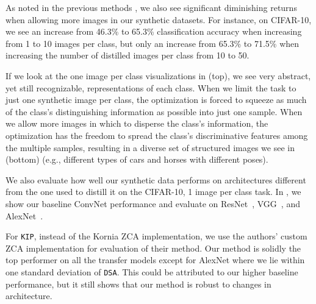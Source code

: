 \documentclass[main.tex]{subfiles}
\begin{document}
As noted in the previous methods \citep{dd}, we also see significant diminishing returns when allowing more images in our synthetic datasets. For instance, on CIFAR-10, we see an increase from 46.3\% to 65.3\% classification accuracy when increasing from 1 to 10 images per class, but only an increase from 65.3\% to 71.5\% when increasing the number of distilled images per class from 10 to 50.

If we look at the one image per class visualizations in  (top), we see very abstract, yet still recognizable, representations of each class. When we limit the task to just one synthetic image per class, the optimization is forced to squeeze as much of the class's distinguishing information as possible into just one sample. When we allow more images in which to disperse the class's information, the optimization has the freedom to spread the class's discriminative features among the multiple samples, resulting in a diverse set of structured images we see in  (bottom) (e.g., different types of cars and horses with different poses).



We also evaluate how well our synthetic data performs on architectures different from the one used to distill it on the CIFAR-10, 1 image per class task. In , we show our baseline \linebreak ConvNet performance and evaluate on ResNet~\cite{resnet}, VGG~\cite{vgg}, and AlexNet~\cite{alexnet}. 
 
For \texttt{KIP}, instead of the Kornia \cite{kornia} ZCA implementation, we use the authors' custom ZCA implementation for evaluation of their method. Our method is solidly the top performer on all the transfer models except for AlexNet where we lie within one standard deviation of \texttt{DSA}. This could be attributed to our higher baseline performance, but it still shows that our method is robust to changes in architecture.
\end{document}
